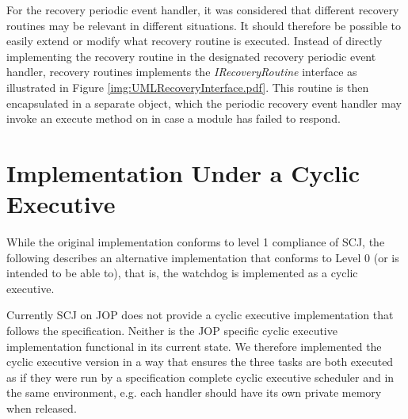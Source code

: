 For the recovery periodic event handler, it was considered that different recovery routines may be relevant in different situations. It should therefore be possible to easily extend or modify what recovery routine is executed. Instead of directly implementing the recovery routine in the designated recovery periodic event handler, recovery routines implements the \emph{IRecoveryRoutine} interface as illustrated in Figure \ref{img:UMLRecoveryInterface.pdf}. This routine is then encapsulated in a separate object, which the periodic recovery event handler may invoke an execute method on in case a module has failed to respond.


\section{Implementation Under a Cyclic Executive} %
\label{sec:implementing_the_watchdog_as_a_cyclic_executive}
While the original implementation conforms to level 1 compliance of SCJ, the following describes an alternative implementation that conforms to Level 0 (or is intended to be able to), that is, the watchdog is implemented as a cyclic executive.

Currently SCJ on JOP does not provide a cyclic executive implementation that follows the specification. Neither is the JOP specific cyclic executive implementation functional in its current state. We therefore implemented the cyclic executive version in a way that ensures the three tasks are both executed as if they were run by a specification complete cyclic executive scheduler and in the same environment, e.g. each handler should have its own private memory when released.

